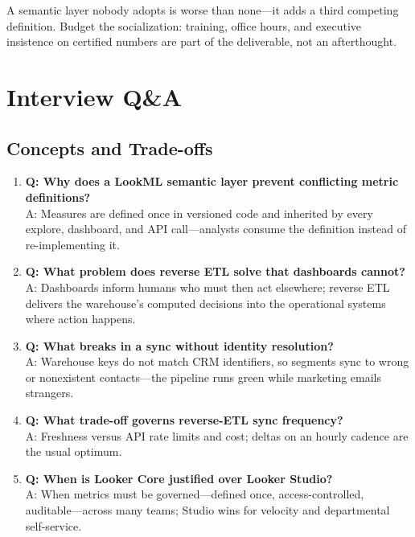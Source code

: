 \begin{pitfall}
A semantic layer nobody adopts is worse than none---it adds a third competing definition. Budget the socialization: training, office hours, and executive insistence on certified numbers are part of the deliverable, not an afterthought.
\end{pitfall}

\section{Interview Q\&A}
\subsection{Concepts and Trade-offs}
\begin{enumerate}
    \item \textbf{Q: Why does a LookML semantic layer prevent conflicting metric definitions?}\\
    A: Measures are defined once in versioned code and inherited by every explore, dashboard, and API call---analysts consume the definition instead of re-implementing it.

    \item \textbf{Q: What problem does reverse ETL solve that dashboards cannot?}\\
    A: Dashboards inform humans who must then act elsewhere; reverse ETL delivers the warehouse's computed decisions into the operational systems where action happens.

    \item \textbf{Q: What breaks in a sync without identity resolution?}\\
    A: Warehouse keys do not match CRM identifiers, so segments sync to wrong or nonexistent contacts---the pipeline runs green while marketing emails strangers.

    \item \textbf{Q: What trade-off governs reverse-ETL sync frequency?}\\
    A: Freshness versus API rate limits and cost; deltas on an hourly cadence are the usual optimum.

    \item \textbf{Q: When is Looker Core justified over Looker Studio?}\\
    A: When metrics must be governed---defined once, access-controlled, auditable---across many teams; Studio wins for velocity and departmental self-service.
\end{enumerate}

